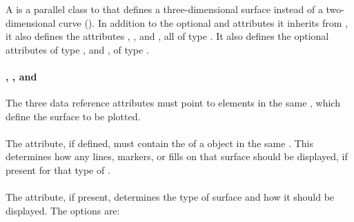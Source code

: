\subsubsection{}
\label{class:surface}
\begin{blockChanged}
A \Surface is a parallel class to \AbstractCurve that defines a three-dimensional surface instead of a two-dimensional curve ().  In addition to the optional  and  attributes it inherits from \SedBase, it also defines the  attributes , , and , all of type \SIdRef.  It also defines the optional attributes  of type \SIdRef, and , of type \SurfaceType.




\paragraph*{, , and }
The three data reference attributes must point to \DataGenerator elements in the same \SedDocument, which define the surface to be plotted.  

\paragraph*{}
The  attribute, if defined, must contain the  of a \Style object in the same \SedDocument.  This \Style determines how any lines, markers, or fills on that surface should be displayed, if present for that type of \Surface.

\paragraph*{}
The  attribute, if present, determines the type of surface and how it should be displayed.  The options are:


\end{blockChanged}
